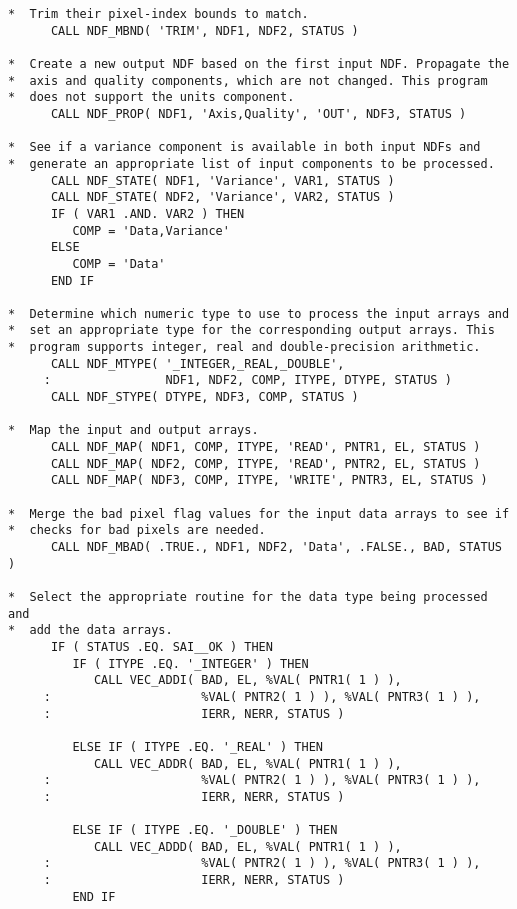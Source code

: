 \begin{verbatim}
*  Trim their pixel-index bounds to match.
      CALL NDF_MBND( 'TRIM', NDF1, NDF2, STATUS )

*  Create a new output NDF based on the first input NDF. Propagate the
*  axis and quality components, which are not changed. This program
*  does not support the units component.
      CALL NDF_PROP( NDF1, 'Axis,Quality', 'OUT', NDF3, STATUS )

*  See if a variance component is available in both input NDFs and
*  generate an appropriate list of input components to be processed.
      CALL NDF_STATE( NDF1, 'Variance', VAR1, STATUS )
      CALL NDF_STATE( NDF2, 'Variance', VAR2, STATUS )
      IF ( VAR1 .AND. VAR2 ) THEN
         COMP = 'Data,Variance'
      ELSE
         COMP = 'Data'
      END IF

*  Determine which numeric type to use to process the input arrays and
*  set an appropriate type for the corresponding output arrays. This
*  program supports integer, real and double-precision arithmetic.
      CALL NDF_MTYPE( '_INTEGER,_REAL,_DOUBLE',
     :                NDF1, NDF2, COMP, ITYPE, DTYPE, STATUS )
      CALL NDF_STYPE( DTYPE, NDF3, COMP, STATUS )

*  Map the input and output arrays.
      CALL NDF_MAP( NDF1, COMP, ITYPE, 'READ', PNTR1, EL, STATUS )
      CALL NDF_MAP( NDF2, COMP, ITYPE, 'READ', PNTR2, EL, STATUS )
      CALL NDF_MAP( NDF3, COMP, ITYPE, 'WRITE', PNTR3, EL, STATUS )

*  Merge the bad pixel flag values for the input data arrays to see if
*  checks for bad pixels are needed.
      CALL NDF_MBAD( .TRUE., NDF1, NDF2, 'Data', .FALSE., BAD, STATUS )

*  Select the appropriate routine for the data type being processed and
*  add the data arrays.
      IF ( STATUS .EQ. SAI__OK ) THEN
         IF ( ITYPE .EQ. '_INTEGER' ) THEN
            CALL VEC_ADDI( BAD, EL, %VAL( PNTR1( 1 ) ),
     :                     %VAL( PNTR2( 1 ) ), %VAL( PNTR3( 1 ) ),
     :                     IERR, NERR, STATUS )

         ELSE IF ( ITYPE .EQ. '_REAL' ) THEN
            CALL VEC_ADDR( BAD, EL, %VAL( PNTR1( 1 ) ),
     :                     %VAL( PNTR2( 1 ) ), %VAL( PNTR3( 1 ) ),
     :                     IERR, NERR, STATUS )

         ELSE IF ( ITYPE .EQ. '_DOUBLE' ) THEN
            CALL VEC_ADDD( BAD, EL, %VAL( PNTR1( 1 ) ),
     :                     %VAL( PNTR2( 1 ) ), %VAL( PNTR3( 1 ) ),
     :                     IERR, NERR, STATUS )
         END IF


\end{verbatim}

